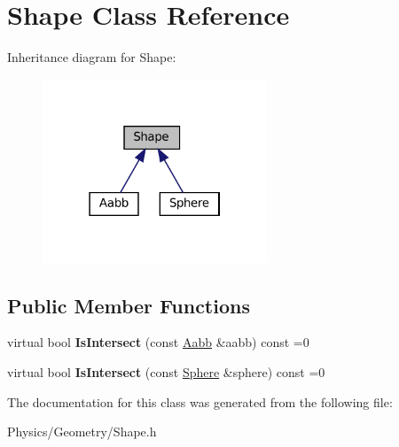 \hypertarget{classShape}{}\section{Shape Class Reference}
\label{classShape}


Inheritance diagram for Shape\+:\nopagebreak
\begin{figure}[H]
\begin{center}
\leavevmode
\includegraphics[width=190pt]{classShape__inherit__graph}
\end{center}
\end{figure}
\subsection*{Public Member Functions}
\begin{DoxyCompactItemize}
\item 
\mbox{\label{classShape_a1bfc3d6c995c4326d4691b22d16d2f12}} 
virtual bool {\bfseries Is\+Intersect} (const \hyperlink{classAabb}{Aabb} \&aabb) const =0
\item 
\mbox{\label{classShape_a1c942dca54e0d81f685624f33f2ce6c8}} 
virtual bool {\bfseries Is\+Intersect} (const \hyperlink{classSphere}{Sphere} \&sphere) const =0
\end{DoxyCompactItemize}


The documentation for this class was generated from the following file\+:\begin{DoxyCompactItemize}
\item 
Physics/\+Geometry/Shape.\+h\end{DoxyCompactItemize}
